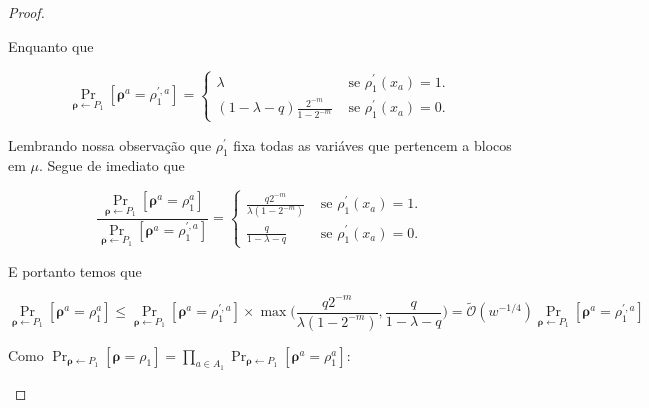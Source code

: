 \begin{proof}
\begin{enumerate}
	Enquanto que
	
	\begin{equation*}
		\Pr_{\boldsymbol{\rho} \leftarrow P_{1}}[\boldsymbol{\rho}^{a} = \rho_{1}^{\prime, a}] = \begin{cases}
																 	\lambda & \text{ se } \rho_{1}^{\prime}(x_{a}) = 1. \\
																 	(1 - \lambda - q)\frac{2^{-m}}{1 - 2^{-m}} & \text{ se } \rho_{1}^{\prime}(x_{a}) = 0.
		                                                        									 \end{cases}
	\end{equation*}

	Lembrando nossa observação que $\rho_{1}^{\prime}$ fixa todas as variáves que pertencem a blocos em $\mu$. Segue de imediato que
	
	\begin{equation*}
		\frac{\Pr_{\boldsymbol{\rho} \leftarrow P_{1}}[\boldsymbol{\rho}^{a} = \rho_{1}^{a}]}{\Pr_{\boldsymbol{\rho} \leftarrow P_{1}}[\boldsymbol{\rho}^{a} = \rho_{1}^{\prime, a}]} = \begin{cases}
																													         	\frac{q2^{-m}}{\lambda(1 - 2^{-m})} & \text{ se } \rho_{1}^{\prime}(x_{a}) = 1. \\
																													         	\frac{q}{1 - \lambda - q} & \text{ se } \rho_{1}^{\prime}(x_{a}) = 0.
																													         \end{cases}
	\end{equation*}


	E portanto temos que
	
	\begin{equation} \label{projection_switching_lemma_eq1}
		\Pr_{\boldsymbol{\rho} \leftarrow P_{1}}[\boldsymbol{\rho}^{a} = \rho_{1}^{a}] \leq \Pr_{\boldsymbol{\rho} \leftarrow P_{1}}[\boldsymbol{\rho}^{a} = \rho_{1}^{\prime, a}] \times \max\bigg(\frac{q2^{-m}}{\lambda(1 - 2^{-m})}, \frac{q}{1 - \lambda - q} \bigg) = \widetilde{\mathcal{O}}(w^{-1/4})\Pr_{\boldsymbol{\rho} \leftarrow P_{1}}[\boldsymbol{\rho}^{a} = \rho_{1}^{\prime, a}]
	\end{equation}
	
	Como $\Pr_{\boldsymbol{\rho} \leftarrow P_{1}}[\boldsymbol{\rho} = \rho_{1}] = \prod_{a \in A_{1}}\Pr_{\boldsymbol{\rho} \leftarrow P_{1}}[\boldsymbol{\rho}^{a} = \rho_{1}^{a}]$:
	

\end{enumerate}
\end{proof}
